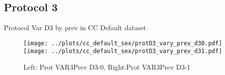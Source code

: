 \documentclass[10pt,a4paper]{article}
\begin{document}
\clearpage
\newpage
\subsection{Protocol 3}

\begin{table}[h!]
\small

\caption{Protocol Var D3 by prev in CC Default dataset}
\end{table}

\begin{figure}[h!]
\texttt{[image: ../plots/cc\_default\_sex/protD3\_vary\_prev\_d30.pdf]}
\texttt{[image: ../plots/cc\_default\_sex/protD3\_vary\_prev\_d31.pdf]}
\caption{Left: Prot VAR3Prev D3-0, Right:Prot VAR3Prev D3-1}
\end{figure}
\end{document}
